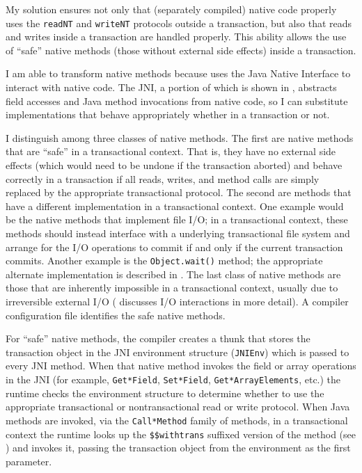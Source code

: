 My solution ensures not only that (separately compiled) native code
properly uses the \texttt{readNT} and  \texttt{writeNT} protocols
outside a transaction, but also that reads and writes inside a
transaction are handled properly.  This ability allows the use of ``safe''
native methods (those without external side effects) inside a
transaction. 

I am able to transform native methods because \flex uses the
Java Native Interface
\cite{JNI} to interact with native code.  The JNI, a portion of which
is shown in , abstracts field
accesses and Java method invocations from native code, so I can
substitute implementations that behave appropriately whether in a
transaction or not.

I distinguish among three classes of native methods.  The first are
native methods that are ``safe'' in a transactional context.  That
is, they have no external side effects (which would need to be undone
if the transaction aborted) and behave correctly in a
transaction if all reads, writes, and method calls are simply replaced
by the appropriate transactional protocol.   The second are methods
that have a different implementation in a transactional context. One
example would be the native methods that implement file I/O; in a
transactional context, these methods should instead interface with a underlying
transactional file system and arrange for the I/O operations to commit
if and only if the current transaction commits.  Another example is the
\texttt{Object.wait()} method; the appropriate alternate implementation is
described in .   The last class of native methods
are those that are inherently impossible in a transactional context,
usually due to irreversible external I/O ( discusses I/O
interactions in more detail).  A compiler configuration file
identifies the safe native methods.

For ``safe'' native methods, the \flex compiler creates a thunk that
stores the transaction object in the JNI environment structure
(\texttt{JNIEnv}) which is passed to every JNI method.  When that
native method invokes the field or array operations in the JNI (for
example, \texttt{Get*Field}, \texttt{Set*Field}, \texttt{Get*ArrayElements},
etc.) the runtime checks the environment structure to
determine whether to use the appropriate transactional or
nontransactional read or write protocol.  When Java methods are
invoked, via the \texttt{Call*Method} family of methods, in a
transactional context the runtime looks up the \texttt{\$\$withtrans}
suffixed version of the method (see ) and invokes
it, passing the transaction object from the environment as the first
parameter.

